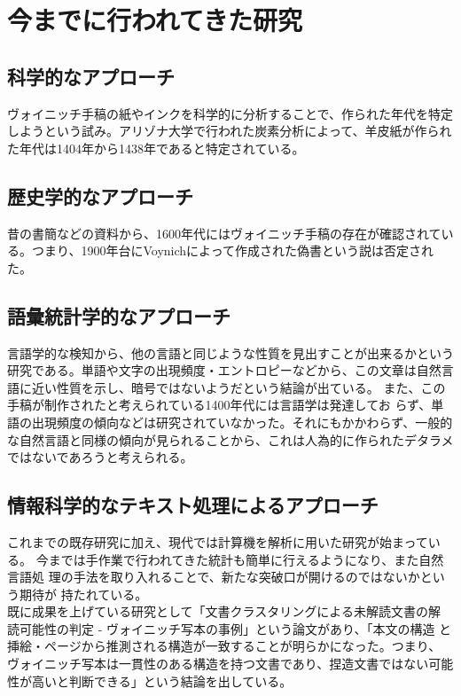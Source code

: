 \documentclass[a4paper,7pt]{jsarticle}
\begin{document}
\section{今までに行われてきた研究}
\subsection{科学的なアプローチ}
ヴォイニッチ手稿の紙やインクを科学的に分析することで、作られた年代を特定
しようという試み。アリゾナ大学で行われた炭素分析によって、羊皮紙が作られ
た年代は1404年から1438年であると特定されている。
\subsection{歴史学的なアプローチ}
昔の書簡などの資料から、1600年代にはヴォイニッチ手稿の存在が確認されている。つまり、1900年台にVoynichによって作成された偽書という説は否定された。
\subsection{語彙統計学的なアプローチ}
言語学的な検知から、他の言語と同じような性質を見出すことが出来るかという
研究である。単語や文字の出現頻度・エントロピーなどから、この文章は自然言
語に近い性質を示し、暗号ではないようだという結論が出ている。
また、この手稿が制作されたと考えられている1400年代には言語学は発達してお
らず、単語の出現頻度の傾向などは研究されていなかった。それにもかかわらず、一般的な自然言語と同様の傾向が見られることから、これは人為的に作られたデタラメではないであろうと考えられる。

\subsection{情報科学的なテキスト処理によるアプローチ}
これまでの既存研究に加え、現代では計算機を解析に用いた研究が始まっている。
今までは手作業で行われてきた統計も簡単に行えるようになり、また自然言語処
理の手法を取り入れることで、新たな突破口が開けるのではないかという期待が
持たれている。\\

既に成果を上げている研究として「文書クラスタリングによる未解読文書の解
読可能性の判定 - ヴォイニッチ写本の事例」という論文があり、「本文の構造
と挿絵・ページから推測される構造が一致することが明らかになった。つまり、
ヴォイニッチ写本は一貫性のある構造を持つ文書であり、捏造文書ではない可能
性が高いと判断できる」という結論を出している。

\newpage
\end{document}
